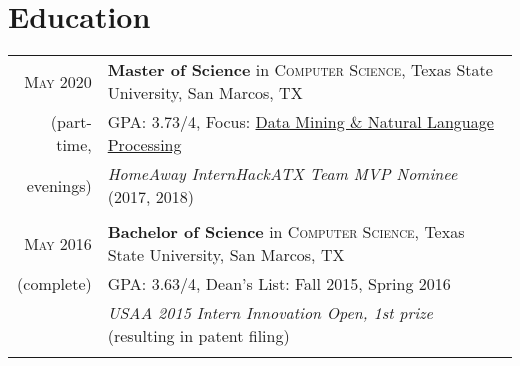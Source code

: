\documentclass[a4paper,10pt]{article}
\begin{document}
\section{Education}
\begin{tabular}{rl}	
	\textsc{May} 2020 & \textbf{Master of Science} in \textsc{Computer Science}, Texas State University, San Marcos, TX\\
	
	(part-time, &\normalsize \textsc{GPA}: 3.73/4, Focus: \underline{Data Mining \& Natural Language Processing} \\ 
	
	evenings)& \emph{HomeAway InternHackATX Team MVP Nominee} (2017, 2018) \\
	
	& \\
	
	\textsc{May} 2016 & \textbf{Bachelor of Science} in \textsc{Computer Science}, Texas State University, San Marcos, TX \\
	
	(complete) &\normalsize \textsc{GPA}: 3.63/4,  Dean's List: Fall 2015, Spring 2016 \\
	
	& \emph{USAA 2015 Intern Innovation Open, 1st prize} (resulting in patent filing)  \\
	
	& \\
\end{tabular}

\end{document}
